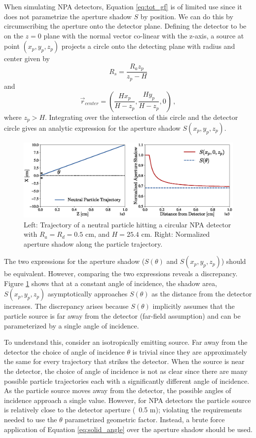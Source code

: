 When simulating NPA detectors, Equation \ref{eq:tot_gf} is of limited use since it does not parametrize the aperture shadow $S$ by position. We can do this by circumscribing the aperture onto the detector plane. Defining the detector to be on the $z=0$ plane with the normal vector co-linear with the z-axis, a source at point $(x_p,y_p,z_p)$ projects a circle onto the detecting plane with radius and center given by
\begin{equation}
\label{eq:shadow_radius}
R_s = \frac{R_a z_p}{z_p - H}
\end{equation}
and
\begin{equation}
\label{eq:shadow_center}
\vec{r}_{center} = \left(\frac{H x_p}{H-z_p} , \frac{H y_p}{H-z_p} ,0\right)\,,
\end{equation} 
where $z_p > H$. Integrating over the intersection of this circle and the detector circle gives an analytic expression for the aperture shadow $S(x_p,y_p,z_p)$.

\begin{figure}[h!]
    \centering
    \includegraphics[width=15cm]{figures/aperture_shadow.eps}
    \caption{Left: Trajectory of a neutral particle hitting a circular NPA detector with $R_a=R_d = 0.5$ cm, and $H= 25.4$ cm. Right: Normalized aperture shadow along the particle trajectory.}
    \label{fig:shadow_compare}
\end{figure}
The two expressions for the aperture shadow ($S(\theta)$ and $S(x_p,y_p,z_p)$) should be equivalent. However, comparing the two expressions reveals a discrepancy. 
Figure \ref{fig:shadow_compare} shows that at a constant angle of incidence, the shadow area, $S(x_p,y_p,z_p)$ asymptotically approaches $S(\theta)$ as the distance from the detector increases. The discrepancy arises because $S(\theta)$ implicitly assumes that the particle source is far away from the detector (far-field assumption) and can be parameterized by a single angle of incidence. 

To understand this, consider an isotropically emitting source. Far away from the detector the choice of angle of incidence $\theta$ is trivial since they are approximately the same for every trajectory that strikes the detector. When the source is near the detector, the choice of angle of incidence is not as clear since there are many possible particle trajectories each with a significantly different angle of incidence. As the particle source moves away from the detector, the possible angles of incidence approach a single value. 
However, for NPA detectors the particle source is relatively close to the detector aperture (~0.5 m); violating the requirements needed to use the $\theta$ parametrized geometric factor. Instead, a brute force application of Equation \ref{eq:solid_angle} over the aperture shadow should be used.

